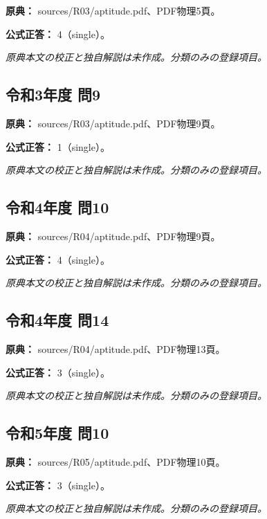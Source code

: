 \noindent\textbf{原典：} sources/R03/aptitude.pdf、PDF物理5頁。

\textbf{公式正答：} 4（single）。

\par\textit{原典本文の校正と独自解説は未作成。分類のみの登録項目。}

\subsection{令和3年度 問9}
\label{q:r03-reg-apt-09}

\noindent\textbf{原典：} sources/R03/aptitude.pdf、PDF物理9頁。

\textbf{公式正答：} 1（single）。

\par\textit{原典本文の校正と独自解説は未作成。分類のみの登録項目。}

\subsection{令和4年度 問10}
\label{q:r04-reg-apt-10}

\noindent\textbf{原典：} sources/R04/aptitude.pdf、PDF物理9頁。

\textbf{公式正答：} 4（single）。

\par\textit{原典本文の校正と独自解説は未作成。分類のみの登録項目。}

\subsection{令和4年度 問14}
\label{q:r04-reg-apt-14}

\noindent\textbf{原典：} sources/R04/aptitude.pdf、PDF物理13頁。

\textbf{公式正答：} 3（single）。

\par\textit{原典本文の校正と独自解説は未作成。分類のみの登録項目。}

\subsection{令和5年度 問10}
\label{q:r05-reg-apt-10}

\noindent\textbf{原典：} sources/R05/aptitude.pdf、PDF物理10頁。

\textbf{公式正答：} 3（single）。

\par\textit{原典本文の校正と独自解説は未作成。分類のみの登録項目。}

